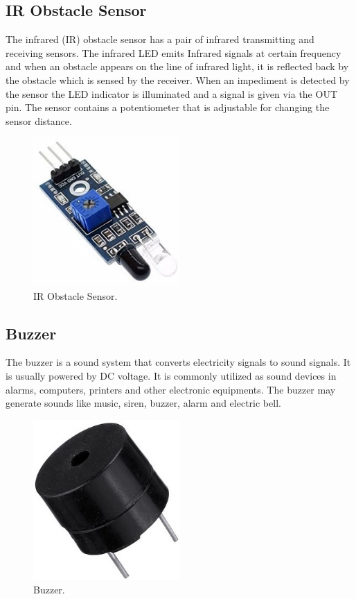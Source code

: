 \subsection{IR Obstacle Sensor}
The infrared (IR) obstacle sensor has a pair of infrared transmitting and receiving sensors. The infrared LED emits Infrared signals at certain frequency and when an obstacle appears on the line of infrared light, it is reflected back by the obstacle which is sensed by the receiver. When an impediment is detected by the sensor the LED indicator is illuminated and a signal is given via the OUT pin. The sensor contains a potentiometer that is adjustable for changing the sensor distance.
\begin{figure}[H]
\centering
\includegraphics[width=0.5\textwidth]{figures/irinfrared-obstaclR-avoidance-sensor.jpg}
\caption{IR Obstacle Sensor.}
\label{IR obstacle sensor}
\end{figure}
\subsection{Buzzer}
The buzzer is a sound system that converts electricity signals to sound signals. It is usually powered by DC voltage. It is commonly utilized as sound devices in alarms, computers, printers and other electronic equipments. The buzzer may generate sounds like music, siren, buzzer, alarm and electric bell.
\begin{figure}[H]
\centering
\includegraphics[width=0.5\textwidth]{figures/Buzzer.jpg}
\caption{Buzzer.}
\label{Buzzer}
\end{figure}
